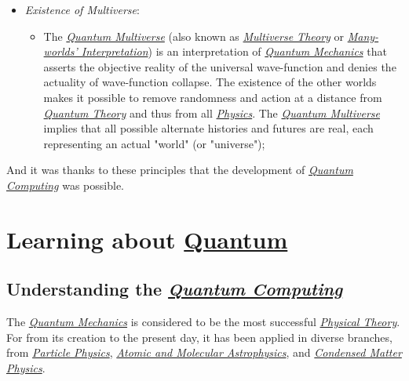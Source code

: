 \documentclass[conference]{IEEEtran}
\begin{document}
\begin{itemize}
  \vspace{4pt}
    
  \item \textit{Existence of Multiverse}:
    \begin{itemize}
        \item The \href{https://en.wikipedia.org/wiki/Many-worlds_interpretation}{\textit{Quantum Multiverse}} (also known as \href{https://en.wikipedia.org/wiki/Many-worlds_interpretation}{\textit{Multiverse Theory}} or \href{https://en.wikipedia.org/wiki/Many-worlds_interpretation}{\textit{Many-worlds' Interpretation}}) is an interpretation of \href{https://en.wikipedia.org/wiki/Quantum_mechanics}{\textit{Quantum Mechanics}} that asserts the objective reality of the universal wave-function and denies the actuality of wave-function collapse. The existence of the other worlds makes it possible to remove randomness and action at a distance from \href{https://en.wikipedia.org/wiki/Quantum_theory}{\textit{Quantum Theory}} and thus from all \href{https://en.wikipedia.org/wiki/Physics}{\textit{Physics}}. The \href{https://en.wikipedia.org/wiki/Many-worlds_interpretation}{\textit{Quantum Multiverse}} implies that all possible alternate histories and futures are real, each representing an actual "world" (or "universe");
    \end{itemize}
\end{itemize}

\vspace{6pt}

And it was thanks to these principles that the development of \href{https://en.wikipedia.org/wiki/Quantum_computing}{\textit{Quantum Computing}} was possible.

\vspace{6pt}

\section{Learning about \href{https://en.wikipedia.org/wiki/Quantum}{Quantum}}

\subsection{Understanding the \href{https://en.wikipedia.org/wiki/Quantum_computing}{\textit{Quantum Computing}}}\label{AA}

The \href{https://en.wikipedia.org/wiki/Quantum_mechanics}{\textit{Quantum Mechanics}} is considered to be the most successful \href{https://en.wikipedia.org/wiki/Theoretical_physics}{\textit{Physical Theory}}. For from its creation to the present day, it has been applied in diverse branches, from \href{https://en.wikipedia.org/wiki/Particle_physics}{\textit{Particle Physics}}, \href{https://en.wikipedia.org/wiki/Atomic_and_molecular_astrophysics}{\textit{Atomic and Molecular Astrophysics}}, and \href{https://en.wikipedia.org/wiki/Condensed_matter_physics}{\textit{Condensed Matter Physics}}.
\end{document}
